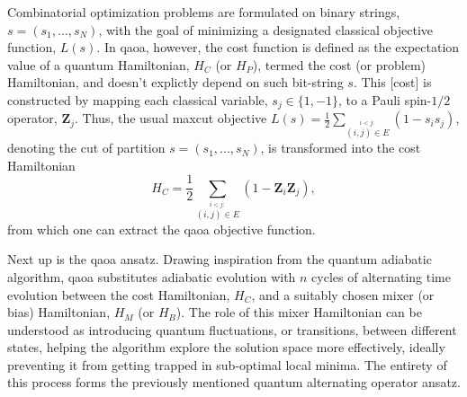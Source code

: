 Combinatorial optimization problems are formulated on binary strings, $s = (s_1,...,s_N)$, with the goal of minimizing a designated classical objective function, $L(s)$. In \acrshort{qaoa}, however, the cost function is defined as the expectation value of a quantum Hamiltonian, $H_C$ (or $H_P$), termed the cost (or problem) Hamiltonian, and doesn't explictly depend on such bit-string $s$. This [cost] is constructed by mapping each classical variable, $s_j \in \{1, -1\}$, to a Pauli spin-$1/2$ operator, $\boldsymbol{Z}_j$. Thus, the usual \acrshort{maxcut} objective $L(s) = \frac{1}{2}\sum_{\stackrel{i < j:}{(i,j)\in E}}(1-s_{i}s_{j})$, denoting the cut of partition $s = (s_1,...,s_N)$, is transformed into the cost Hamiltonian
\begin{equation}\label{eq:H_C}
  H_C = \frac{1}{2}\sum_{\stackrel{i < j:}{(i,j)\in E}}(1-\boldsymbol{Z}_i\boldsymbol{Z}_j),
\end{equation}
from which one can extract the \acrshort{qaoa} objective function.

Next up is the \acrshort{qaoa} ansatz. Drawing inspiration from the quantum adiabatic algorithm, \acrshort{qaoa} substitutes adiabatic evolution with $n$ cycles of alternating time evolution between the cost Hamiltonian, $H_C$, and a suitably chosen mixer (or bias) Hamiltonian, $H_M$ (or $H_B$). The role of this mixer Hamiltonian can be understood as introducing quantum fluctuations, or transitions, between different states, helping the algorithm explore the solution space more effectively, ideally preventing it from getting trapped in sub-optimal local minima. The entirety of this process forms the previously mentioned quantum alternating operator ansatz.

